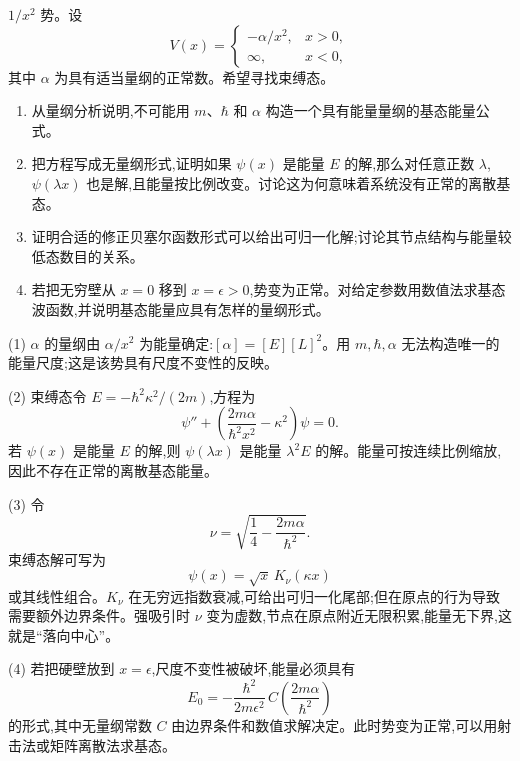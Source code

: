 \begin{question}
$1/x^2$ 势。设
\[
V(x)=\begin{cases}-\alpha/x^2,&x>0,\\ \infty,&x<0,
\end{cases}
\]
其中 $\alpha$ 为具有适当量纲的正常数。希望寻找束缚态。
\begin{enumerate}
\item 从量纲分析说明,不可能用 $m$、$\hbar$ 和 $\alpha$ 构造一个具有能量量纲的基态能量公式。
\item 把方程写成无量纲形式,证明如果 $\psi(x)$ 是能量 $E$ 的解,那么对任意正数 $\lambda$,$\psi(\lambda x)$ 也是解,且能量按比例改变。讨论这为何意味着系统没有正常的离散基态。
\item 证明合适的修正贝塞尔函数形式可以给出可归一化解;讨论其节点结构与能量较低态数目的关系。
\item 若把无穷壁从 $x=0$ 移到 $x=\epsilon>0$,势变为正常。对给定参数用数值法求基态波函数,并说明基态能量应具有怎样的量纲形式。
\end{enumerate}
\end{question}
\begin{solution}
(1) $\alpha$ 的量纲由 $\alpha/x^2$ 为能量确定:$[\alpha]=[E][L]^2$。用 $m,\hbar,\alpha$ 无法构造唯一的能量尺度;这是该势具有尺度不变性的反映。

(2) 束缚态令 $E=-\hbar^2\kappa^2/(2m)$,方程为
\[
\psi''+\left(\frac{2m\alpha}{\hbar^2x^2}-\kappa^2\right)\psi=0.
\]
若 $\psi(x)$ 是能量 $E$ 的解,则 $\psi(\lambda x)$ 是能量 $\lambda^2E$ 的解。能量可按连续比例缩放,因此不存在正常的离散基态能量。

(3) 令
\[
\nu=\sqrt{\frac14-\frac{2m\alpha}{\hbar^2}}.
\]
束缚态解可写为
\[
\psi(x)=\sqrt{x}\,K_\nu(\kappa x)
\]
或其线性组合。$K_\nu$ 在无穷远指数衰减,可给出可归一化尾部;但在原点的行为导致需要额外边界条件。强吸引时 $\nu$ 变为虚数,节点在原点附近无限积累,能量无下界,这就是“落向中心”。

(4) 若把硬壁放到 $x=\epsilon$,尺度不变性被破坏,能量必须具有
\[
E_0=-\frac{\hbar^2}{2m\epsilon^2}\,C\left(\frac{2m\alpha}{\hbar^2}\right)
\]
的形式,其中无量纲常数 $C$ 由边界条件和数值求解决定。此时势变为正常,可以用射击法或矩阵离散法求基态。
\end{solution}

